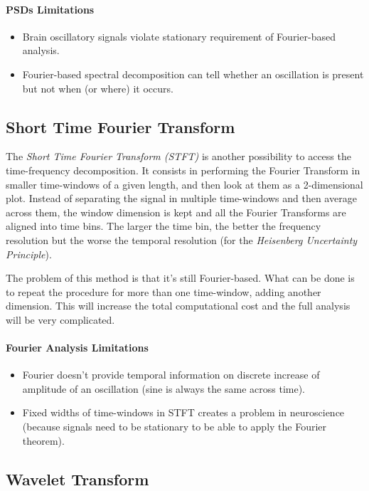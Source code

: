 \paragraph{PSDs Limitations}
\begin{itemize}
    \item Brain oscillatory signals violate stationary requirement of Fourier-based analysis.
    \item Fourier-based spectral decomposition can tell whether an oscillation is present but not when (or where) it occurs.
\end{itemize}

\subsection{Short Time Fourier Transform}
The \textit{Short Time Fourier Transform (STFT)} is another possibility to access the time-frequency decomposition.
It consists in performing the Fourier Transform in smaller time-windows of a given length, and then look at them as a 
2-dimensional plot. Instead of separating the signal in multiple time-windows and then average across them, the window 
dimension is kept and all the Fourier Transforms are aligned into time bins. The larger the time bin, the better the 
frequency resolution but the worse the temporal resolution (for the \textit{Heisenberg Uncertainty Principle}).
\par\medskip
The problem of this method is that it's still Fourier-based. What can be done is to repeat the procedure for more than one 
time-window, adding another dimension. This will increase the total computational cost and the full analysis will be very 
complicated.

\paragraph{Fourier Analysis Limitations}
\begin{itemize}
    \item Fourier doesn't provide temporal information on discrete increase of amplitude of an oscillation (sine is always the 
    same across time).
    \item Fixed widths of time-windows in STFT creates a problem in neuroscience (because signals need to be stationary to be 
    able to apply the Fourier theorem).
\end{itemize}

\subsection{Wavelet Transform}